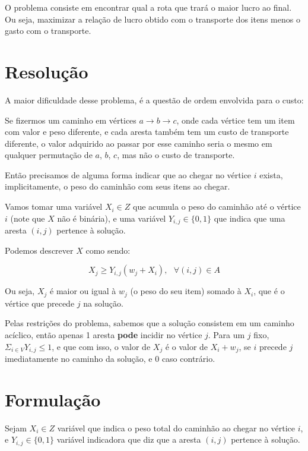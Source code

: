 \documentclass[conference]{IEEEtran}
\begin{document}
    O problema consiste em encontrar qual a rota que trará o maior lucro ao final. Ou seja, maximizar a relação de lucro obtido com o transporte dos itens menos o gasto com o transporte.

\section {Resolução}

    A maior dificuldade desse problema, é a questão de ordem envolvida para o custo:

    Se fizermos um caminho em vértices $a \rightarrow b \rightarrow c$, onde cada vértice tem um item com valor e peso diferente, e cada aresta também tem um custo de transporte diferente, o valor adquirido ao passar por esse caminho seria o mesmo em qualquer permutação de $a$, $b$, $c$, mas não o custo de transporte.

    Então precisamos de alguma forma indicar que ao chegar no vértice $i$ exista, implicitamente, o peso do caminhão com seus itens ao chegar.

    Vamos tomar uma variável $X_i \in Z$ que acumula o peso do caminhão até o vértice $i$ (note que $X$ não é binária), e uma variável $Y_{i,j} \in \{0,1\}$ que indica que uma aresta $(i,j)$ pertence à solução.

    Podemos descrever $X$ como sendo:

    \begin{equation}
        X_j \geq Y_{i,j} ( w_j + X_i ), \text{ } \forall (i,j) \in A
    \end{equation}

    Ou seja, $X_j$ é maior ou igual à $w_j$ (o peso do seu item) somado à $X_i$, que é o vértice que precede $j$ na solução.

    Pelas restrições do problema, sabemos que a solução consistem em um caminho acíclico, então apenas 1 aresta \textbf{pode} incidir no vértice $j$. Para um $j$ fixo, $\Sigma_{i \in V} Y_{i,j} \leq 1$,
    e que com isso, o valor de $X_j$ é o valor de $X_{i} + w_{j}$, se $i$ precede $j$ imediatamente no caminho da solução, e $0$ caso contrário.
\\

\section {Formulação}

    Sejam $X_i \in Z$ variável que indica o peso total do caminhão ao chegar no vértice $i$, e $Y_{i,j} \in \{0, 1\}$ variável indicadora que diz que a aresta $(i,j)$ pertence à solução.
\end{document}
